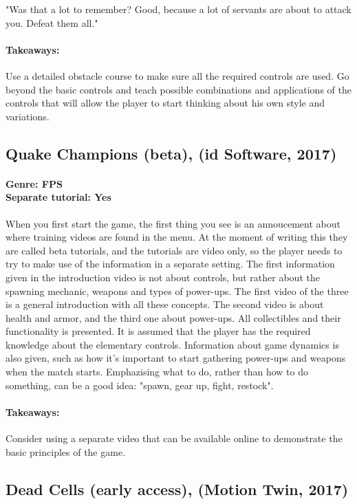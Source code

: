 "Was that a lot to remember?
Good, because a lot of servants are about to attack you.
Defeat them all."
\paragraph{Takeaways:}
Use a detailed obstacle course to make sure all the required controls are used.
Go beyond the basic controls and teach possible combinations and applications of the controls that will allow the player to start thinking about his own style and variations.

\subsection{Quake Champions (beta), (id Software, 2017)}
\paragraph{Genre: FPS \\ Separate tutorial: Yes \\}
When you first start the game, the first thing you see is an annoucement about
where training videos are found in the menu. At the moment of writing this
they are called beta tutorials, and the tutorials are video only, so the
player needs to try to make use of the information in a separate setting. The
first information given in the introduction video is not about controls, but
rather about the spawning mechanic, weapons and types of power-ups. The first
video of the three is a general introduction with all these concepts. The
second video is about health and armor, and the third one about power-ups.
All collectibles and their functionality is presented. It is assumed that the
player has the required knowledge about the elementary controls. Information about game dynamics is also given, such as how it's important to start gathering power-ups and weapons when the match starts. Emphazising what to do, rather than how to do something, can be a good idea: "spawn, gear up, fight, restock".
\paragraph{Takeaways:}
Consider using a separate video that can be available online to demonstrate the basic principles of the game.

\subsection{Dead Cells (early access), (Motion Twin, 2017)}
